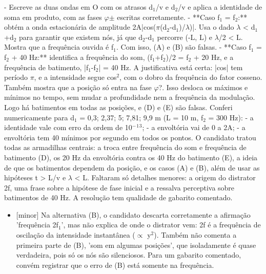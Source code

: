 \documentclass{article}%
\begin{document}
{-} Escreve as duas ondas em O com os atrasos d$_{1}$/v e d$_{2}$/v e aplica a identidade de soma em produto, com as fases $\varphi$$\pm$ escritas corretamente.\newline%
{-} **Caso f$_{1}$ = f$_{2}$:** obtém a onda estacionária de amplitude 2A|cos($\pi$(d$_{2}$-d$_{1}$)/$\lambda$)|. Usa o dado $\lambda$ < d$_{1}$+d$_{2}$ para garantir que existem nós, já que d$_{2}$-d$_{1}$ percorre (-L, L) e $\lambda$/2 < L. Mostra que a frequência ouvida é f$_{1}$. Com isso, (A) e (B) são falsas.\newline%
{-} **Caso f$_{1}$ = f$_{2}$ + 40 Hz:** identifica a frequência do som, (f$_{1}$+f$_{2}$)/2 = f$_{2}$ + 20 Hz, e a frequência de batimento, |f$_{1}$-f$_{2}$| = 40 Hz. A justificativa está certa: |cos| tem período $\pi$, e a intensidade segue cos$^2$, com o dobro da frequência do fator cosseno. Também mostra que a posição só entra na fase $\varphi$?. Isso desloca os máximos e mínimos no tempo, sem mudar a profundidade nem a frequência da modulação. Logo há batimentos em todas as posições, e (D) e (E) são falsas.\newline%
\newline%
Conferi numericamente para d$_{1}$ = 0,3; 2,37; 5; 7,81; 9,9 m (L = 10 m, f$_{2}$ = 300 Hz):\newline%
{-} a identidade vale com erro da ordem de 10$^{-}$$^{1}$$^3$;\newline%
{-} a envoltória vai de 0 a 2A;\newline%
{-} a envoltória tem 40 mínimos por segundo em todos os pontos.\newline%
\newline%
O candidato tratou todas as armadilhas centrais: a troca entre frequência do som e frequência de batimento (D), os 20 Hz da envoltória contra os 40 Hz do batimento (E), a ideia de que os batimentos dependem da posição, e os casos (A) e (B), além de usar as hipóteses t > L/v e $\lambda$ < L. Faltaram só detalhes menores: a origem do distrator 2f, uma frase sobre a hipótese de fase inicial e a ressalva perceptiva sobre batimentos de 40 Hz. A resolução tem qualidade de gabarito comentado.%
\begin{itemize}%
\item%
{[}minor{]} Na alternativa (B), o candidato descarta corretamente a afirmação 'frequência 2f$_{1}$', mas não explica de onde o distrator vem: 2f é a frequência de oscilação da intensidade instantânea ($\propto$ y$^2$). Também não comenta a primeira parte de (B), 'som em algumas posições', que isoladamente é quase verdadeira, pois só os nós são silenciosos. Para um gabarito comentado, convém registrar que o erro de (B) está somente na frequência.%

\end{itemize}$$
\end{document}
